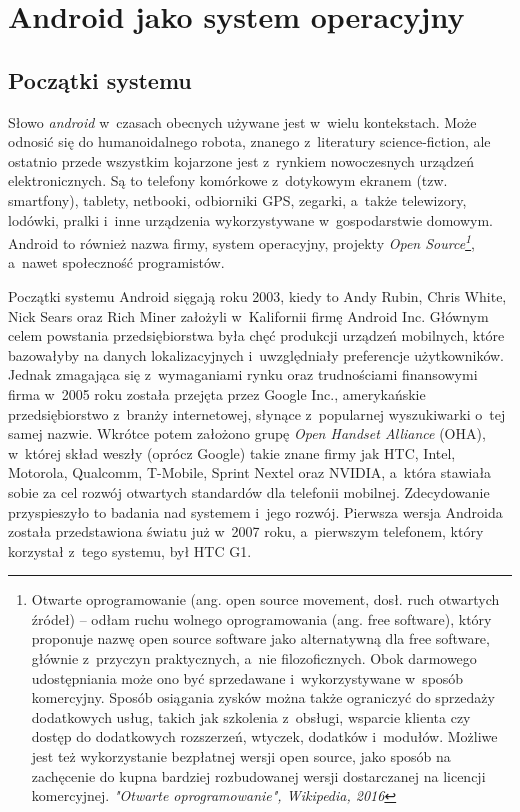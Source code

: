 \chapter{Android jako system operacyjny}

\section{Początki systemu}
Słowo \textit{android} w~czasach obecnych używane jest w~wielu kontekstach. Może odnosić się do humanoidalnego robota, znanego z~literatury science-fiction, ale ostatnio przede wszystkim kojarzone jest z~rynkiem nowoczesnych urządzeń elektronicznych. Są to telefony komórkowe z~dotykowym ekranem (tzw. smartfony), tablety, netbooki, odbiorniki GPS, zegarki, a~także telewizory, lodówki, pralki i~inne urządzenia wykorzystywane w~gospodarstwie domowym. Android to również nazwa firmy, system operacyjny, projekty \textit{Open Source\footnote{Otwarte oprogramowanie (ang. open source movement, dosł. ruch otwartych źródeł) – odłam ruchu wolnego oprogramowania (ang. free software), który proponuje nazwę open source software jako alternatywną dla free software, głównie z~przyczyn praktycznych, a~nie filozoficznych. Obok darmowego udostępniania może ono być sprzedawane i~wykorzystywane w~sposób komercyjny. Sposób osiągania zysków można także ograniczyć do sprzedaży dodatkowych usług, takich jak szkolenia z~obsługi, wsparcie klienta czy dostęp do dodatkowych rozszerzeń, wtyczek, dodatków i~modułów. Możliwe jest też wykorzystanie bezpłatnej wersji open source, jako sposób na zachęcenie do kupna bardziej rozbudowanej wersji dostarczanej na licencji komercyjnej. \textit{"Otwarte oprogramowanie", Wikipedia, 2016}}}, a~nawet społeczność programistów.

Początki systemu Android sięgają roku 2003, kiedy to Andy Rubin, Chris White, Nick Sears oraz Rich Miner założyli w~Kalifornii firmę Android Inc. Głównym celem powstania przedsiębiorstwa była chęć produkcji urządzeń mobilnych, które bazowałyby na danych lokalizacyjnych i~uwzględniały preferencje użytkowników. Jednak zmagająca się z~wymaganiami rynku oraz trudnościami finansowymi firma w~2005 roku została przejęta przez Google Inc., amerykańskie przedsiębiorstwo z~branży internetowej, słynące z~popularnej wyszukiwarki o~tej samej nazwie. Wkrótce potem założono grupę \textit{Open Handset Alliance} (OHA), w~której skład weszły (oprócz Google) takie znane firmy jak HTC, Intel, Motorola, Qualcomm, T-Mobile, Sprint Nextel oraz NVIDIA, a~która stawiała sobie za cel rozwój otwartych standardów dla telefonii mobilnej. Zdecydowanie przyspieszyło to badania nad systemem i~jego rozwój. Pierwsza wersja Androida została przedstawiona światu już w~2007 roku, a~pierwszym telefonem, który korzystał z~tego systemu, był HTC G1.

